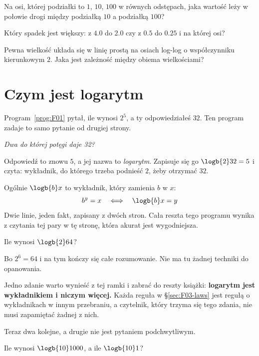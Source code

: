 \begin{quiz}
\item Na osi, której podziałki to $1$, $10$, $100$ w równych odstępach, jaka
  wartość leży w połowie drogi między podziałką $10$ a podziałką $100$?
\item Który spadek jest większy: z $\num{4.0}$ do $\num{2.0}$ czy z $\num{0.5}$
  do $\num{0.25}$ \dash{} i na której osi? 
\item Pewna wielkość układa się w linię prostą na osiach log-log o
  współczynniku kierunkowym $2$. Jaka jest zależność między obiema
  wielkościami? 
\end{quiz}

\section{Czym jest logarytm}
\label{sec:F03-what}

\begin{fr}
Program~\ref{prog:F01} pytał, ile wynosi $2^{5}$, a ty odpowiedziałeś $32$. Ten
program zadaje to samo pytanie od drugiej strony.

\emph{Dwa do której potęgi daje 32?}

Odpowiedź to znowu $5$, a jej nazwa to \emph{logarytm}. Zapisuje się go
$\logb{2} 32 = 5$ i czyta: wykładnik, do którego trzeba podnieść $2$, żeby
otrzymać $32$.

Ogólnie $\logb{b} x$ to wykładnik, który zamienia $b$ w $x$:
\[ b^{y} = x \quad\Longleftrightarrow\quad \logb{b} x = y \]
Dwie linie, jeden fakt, zapisany z dwóch stron. Cała reszta tego programu
wynika z czytania tej pary w tę stronę, która akurat jest wygodniejsza.

Ile wynosi $\logb{2} 64$?
\nextframe
\end{fr}

\begin{fr}
Bo $2^{6} = 64$ i na tym kończy się całe rozumowanie. Nie ma tu żadnej techniki
do opanowania.

Jedno zdanie warto wynieść z tej ramki i zabrać do reszty książki:
\textbf{logarytm jest wykładnikiem i niczym więcej.} Każda reguła w
\S\ref{sec:F03-laws} jest regułą o wykładnikach w innym przebraniu, a czytelnik,
który trzyma się tego zdania, nie musi zapamiętać żadnej z nich.

Teraz dwa kolejne, a drugie nie jest pytaniem podchwytliwym.

Ile wynosi $\logb{10} 1000$, a ile $\logb{10} 1$?
\nextframe
\end{fr}

